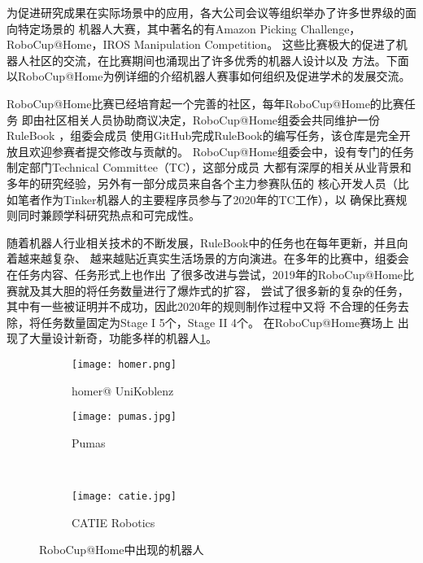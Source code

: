 为促进研究成果在实际场景中的应用，各大公司会议等组织举办了许多世界级的面向特定场景的
机器人大赛，其中著名的有Amazon Picking Challenge\cite{wurman2016amazon}，
RoboCup@Home\cite{wisspeintner2009robocup}，IROS Manipulation Competition\cite{moon2017iros}。
这些比赛极大的促进了机器人社区的交流，在比赛期间也涌现出了许多优秀的机器人设计以及
方法。下面以RoboCup@Home为例详细的介绍机器人赛事如何组织及促进学术的发展交流。

RoboCup@Home比赛已经培育起一个完善的社区，每年RoboCup@Home的比赛任务
即由社区相关人员协助商议决定，RoboCup@Home组委会共同维护一份RuleBook\cite{rulebook}
，组委会成员
使用GitHub完成RuleBook的编写任务，该仓库是完全开放且欢迎参赛者提交修改与贡献的。
RoboCup@Home组委会中，设有专门的任务制定部门Technical Committee（TC），这部分成员
大都有深厚的相关从业背景和多年的研究经验，另外有一部分成员来自各个主力参赛队伍的
核心开发人员（比如笔者作为Tinker机器人的主要程序员参与了2020年的TC工作），以
确保比赛规则同时兼顾学科研究热点和可完成性。

随着机器人行业相关技术的不断发展，RuleBook中的任务也在每年更新，并且向着越来越复杂、
越来越贴近真实生活场景的方向演进。在多年的比赛中，组委会在任务内容、任务形式上也作出
了很多改进与尝试，2019年的RoboCup@Home比赛就及其大胆的将任务数量进行了爆炸式的扩容，
尝试了很多新的复杂的任务，其中有一些被证明并不成功，因此2020年的规则制作过程中又将
不合理的任务去除，将任务数量固定为Stage I 5个，Stage II 4个。 在RoboCup@Home赛场上
出现了大量设计新奇，功能多样的机器人\ref{fig:other_teams}。

\begin{figure}
    \centering
    \begin{minipage}{.45\linewidth}
            \begin{subfigure}[t]{.9\linewidth}
                \texttt{[image: homer.png]}
                \caption{homer@ UniKoblenz}
            \end{subfigure}
    \end{minipage}
    \begin{minipage}{.45\linewidth}
        \begin{subfigure}[t]{.8\linewidth}
            \texttt{[image: pumas.jpg]}
            \caption{Pumas}
        \end{subfigure} \\
        \begin{subfigure}[b]{.8\linewidth}
            \texttt{[image: catie.jpg]}
            \caption{CATIE Robotics}
        \end{subfigure} 
    \end{minipage}
    \caption{RoboCup@Home中出现的机器人}
    \label{fig:other_teams}
\end{figure}

